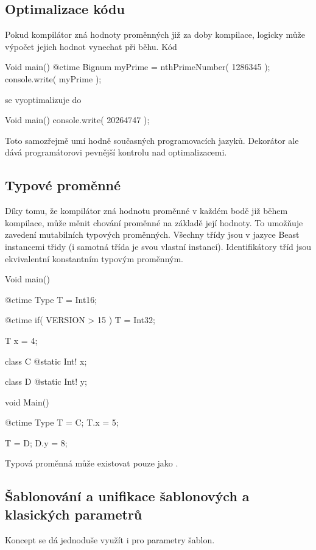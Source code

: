 \subsection{Optimalizace kódu}
Pokud kompilátor zná hodnoty \ctime proměnných již za doby kompilace, logicky může výpočet jejich hodnot vynechat při běhu. Kód

\begin{code}
Void main() {
	@ctime Bignum myPrime = nthPrimeNumber( 1286345 );
	console.write( myPrime );
}
\end{code}

se vyoptimalizuje do

\begin{code}
Void main() {
	console.write( 20264747 );
}
\end{code}

Toto samozřejmě umí hodně současných programovacích jazyků. Dekorátor  ale dává programátorovi pevnější kontrolu nad optimalizacemi.

\subsection{Typové proměnné} \label{ctime:typeVars}
Díky tomu, že kompilátor zná hodnotu \ctime proměnné v každém bodě již během kompilace, může měnit chování \ctime proměnné na základě její hodnoty. To umožňuje zavedení mutabilních typových proměnných. Všechny třídy jsou v jazyce Beast instancemi třidy  (i samotná třída  je svou vlastní instancí). Identifikátory tříd jsou ekvivalentní konstantním typovým proměnným.

\begin{code}
Void main() {
	@ctime Type T = Int16;
	
	@ctime if( VERSION > 15 )
		T = Int32;
		
	T x = 4;
}
\end{code}

\begin{code}
class C {
	@static Int! x;
}

class D {
	@static Int! y;
}

void Main() {
	@ctime Type T = C;
	T.x = 5;
	
	T = D;
	D.y = 8;
}
\end{code}

Typová proměnná může existovat pouze jako \ctime.

\subsection{Šablonování a unifikace šablonových a klasických parametrů}
Koncept \ctime se dá jednoduše využít i pro parametry šablon.

